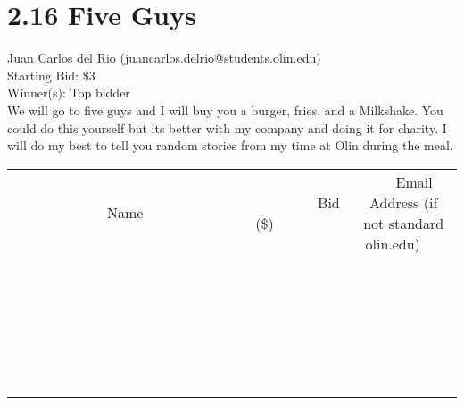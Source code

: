 \documentclass[11pt]{article}
\begin{document}
\section*{2.16 Five Guys }
Juan Carlos del Rio (juancarlos.delrio@students.olin.edu) \\
Starting Bid: \$3 \\
Winner(s): 
Top bidder \\
We will go to five guys and I will buy you a burger, fries, and a Milkshake. You could do this yourself but its better with my company and doing it for charity. I will do my best to tell you random stories from my time at Olin during the meal. \\[6ex]
\begin{tabular}{c c c}
~~~~~~~~~~~~~Name~~~~~~~~~~~~~ & ~~~~~~~~~Bid (\$)~~~~~~~~~ & ~~~Email Address (if not standard olin.edu)~~~ \\
 & & \\
\hline
 & & \\
\hline
 & & \\
\hline
 & & \\
\hline
 & & \\
\hline
 & & \\
\hline
 & & \\
\hline
 & & \\
\hline
 & & \\
\hline
 & & \\
\hline
 & & \\
\hline
 & & \\
\hline
 & & \\
\hline
 & & \\
\hline
 & & \\
\hline
 & & \\
\hline
 & & \\
\hline
 & & \\
\hline
 & & \\
\hline
 & & \\
\hline
 & & \\
\hline
 & & \\
\hline
 & & \\
\hline
 & & \\
\hline
 & & \\
\hline
 & & \\
\hline
\end{tabular}
\clearpage
\end{document}
